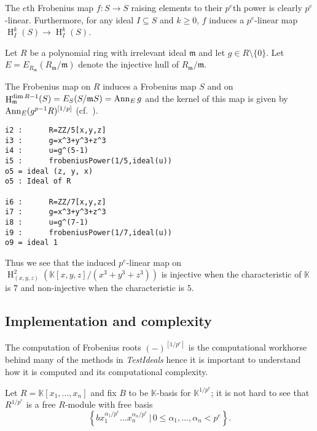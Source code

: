 \documentclass[11pt]{amsart}
\DeclareMathOperator{\HH}{H}
\begin{document}
\begin{example}
The $e$th Frobenius map $f:S \rightarrow S$  raising elements to their $p^e$th power is clearly $p^{e}$-linear.
Furthermore, for any ideal $I\subseteq S$ and $k\geq 0$, $f$ induces a $p^{e}$-linear map $\HH_I^k (S) \rightarrow \HH_I^k (S)$.
\end{example}

Let $R$ be a polynomial ring with irrelevant ideal $\mathfrak{m}$ and let $g\in R\setminus \{0\}$.
Let $E=E_{R_{\mathfrak{m}}}(R_{\mathfrak{m}}/\mathfrak{m})$ denote the injective hull of $R_{\mathfrak{m}}/\mathfrak{m}$.

The Frobenius map on $R$ induces a Frobenius map $S$ and on
$\HH^{\dim R-1}_{\mathfrak{m}} (S)=E_S(S/\mathfrak{m}S)=\Ann_E g$ and the kernel of this map is given by
$\operatorname{{Ann}}_E (g^{p-1}R)^{[1/p]}$ (cf.~\cite[\S 5]{KatzmanParameterTestIdealOfCMRings}).

\begin{verbatim}
i2 :      R=ZZ/5[x,y,z]
i3 :      g=x^3+y^3+z^3
i4 :      u=g^(5-1)
i5 :      frobeniusPower(1/5,ideal(u))
o5 = ideal (z, y, x)
o5 : Ideal of R

i6 :      R=ZZ/7[x,y,z]
i7 :      g=x^3+y^3+z^3
i8 :      u=g^(7-1)
i9 :      frobeniusPower(1/7,ideal(u))
o9 = ideal 1
\end{verbatim}

Thus we see that the induced $p^{e}$-linear map on $\HH_{(x,y,z)}^{2} \left( \mathbb{K}[x,y,z]/(x^3+y^3+z^3) \right)$ is injective
when the characteristic of $\mathbb{K}$ is $7$ and non-injective when the characteristic is $5$.

\subsection{Implementation and complexity}

The computation of Frobenius roots $(-)^{[1/p^e]}$ is the computational workhorse behind many of the methods in \emph{TestIdeals}
hence it is important to understand how it is computed and its computational complexity.

Let $R=\mathbb{K}[x_1, \dots, x_n]$ and fix $B$ to be $\mathbb{K}$-basis for $\mathbb{K}^{1/p^e}$;
it is not hard to see that $R^{1/p^e}$ is a free $R$-module with free basis
$$\left\{ b x_1^{\alpha_1/p^e} \dots x_n^{\alpha_n/p^e} \,|\, 0\leq \alpha_1, \dots, \alpha_n < p^e \right\}.$$
\end{document}
